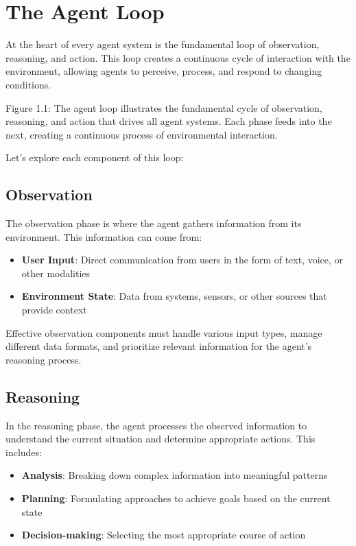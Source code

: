 \documentclass[11pt,oneside]{book}
\providecommand{\tightlist}{%
  \setlength{\itemsep}{0pt}\setlength{\parskip}{0pt}}
\begin{document}
\section{The Agent Loop}\label{the-agent-loop}

At the heart of every agent system is the fundamental loop of
observation, reasoning, and action. This loop creates a continuous cycle
of interaction with the environment, allowing agents to perceive,
process, and respond to changing conditions.

Figure 1.1: The agent loop illustrates the fundamental cycle of
observation, reasoning, and action that drives all agent systems. Each
phase feeds into the next, creating a continuous process of
environmental interaction.

Let's explore each component of this loop:

\subsection{Observation}\label{observation}

The observation phase is where the agent gathers information from its
environment. This information can come from:

\begin{itemize}
\tightlist
\item
  \textbf{User Input}: Direct communication from users in the form of
  text, voice, or other modalities
\item
  \textbf{Environment State}: Data from systems, sensors, or other
  sources that provide context
\end{itemize}

Effective observation components must handle various input types, manage
different data formats, and prioritize relevant information for the
agent's reasoning process.

\subsection{Reasoning}\label{reasoning}

In the reasoning phase, the agent processes the observed information to
understand the current situation and determine appropriate actions. This
includes:

\begin{itemize}
\tightlist
\item
  \textbf{Analysis}: Breaking down complex information into meaningful
  patterns
\item
  \textbf{Planning}: Formulating approaches to achieve goals based on
  the current state
\item
  \textbf{Decision-making}: Selecting the most appropriate course of
  action
\end{itemize}
\end{document}
